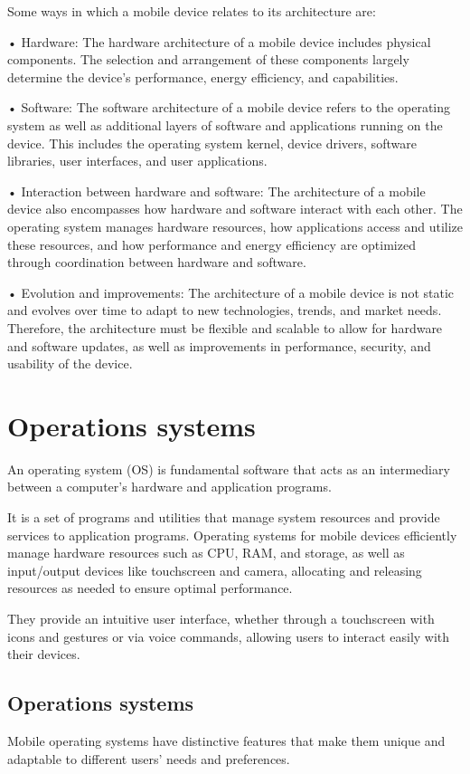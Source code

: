 \documentclass{article}
\begin{document}
\begin{multicols}{2}
		
		Some ways in which a mobile device relates to its architecture are:
		
		
		
	
		• Hardware: The hardware architecture of a mobile device includes physical components. The selection and arrangement of these components largely determine the device's performance, energy efficiency, and capabilities.
		
		
		• Software: The software architecture of a mobile device refers to the operating system as well as additional layers of software and applications running on the device. This includes the operating system kernel, device drivers, software libraries, user interfaces, and user applications.
		
		• Interaction between hardware and software: The architecture of a mobile device also encompasses how hardware and software interact with each other. The operating system manages hardware resources, how applications access and utilize these resources, and how performance and energy efficiency are optimized through coordination between hardware and software.
		
		• Evolution and improvements: The architecture of a mobile device is not static and evolves over time to adapt to new technologies, trends, and market needs. Therefore, the architecture must be flexible and scalable to allow for hardware and software updates, as well as improvements in performance, security, and usability of the device.
		
		\section{Operations systems}
		An operating system (OS) is fundamental software that acts as an intermediary between a computer's hardware and application programs. 
		
		It is a set of programs and utilities that manage system resources and provide services to application programs. Operating systems for mobile devices efficiently manage hardware resources such as CPU, RAM, and storage, as well as input/output devices like touchscreen and camera, allocating and releasing resources as needed to ensure optimal performance. 
		
		They provide an intuitive user interface, whether through a touchscreen with icons and gestures or via voice commands, allowing users to interact easily with their devices.
		
		\subsection{Operations systems}
		Mobile operating systems have distinctive features that make them unique and adaptable to different users' needs and preferences.
		

\end{multicols}
\end{document}
